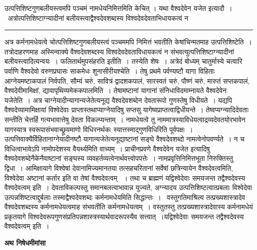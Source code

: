 \documentclass[11pt, openany]{book}
\begin{document}
{\bl उत्पत्तिशिष्टगुणबलीयस्त्वमपि पञ्चमं नामधेयनिमित्तमिति केचित् । यथा {\qtl वैश्वदेवेन यजेत}  इत्यादौ~।~अत्रोत्पत्तिशिष्टाग्न्यादीनां बलीयस्त्वाद्वैश्वदेवशब्दस्य विश्वदेवदेवताभिधायकत्वं न }\\
\hrule
\vspace{3mm}

 अत्र कर्मनामधेयत्वे चोत्पत्तिशिष्टगुणबलीयस्त्वं पञ्चममपि निमित्तं भवतीति  केषांचिन्मतमाह {\br उत्पत्तिशिष्टेति~।} तत्रोदाहरणमाह 
अस्मिन्वाक्ये वैश्वदेवशब्दस्य विश्वदेवदेवताविधायकत्वं न संभवत्युत्पत्तिशिष्टाग्न्यादीनां बलीयस्त्वादित्यन्वयः~। फलितार्थमुपसंहरति {\br इतीति~।} तस्येति शेषः~। {\br अत्रेदं बोध्यम्} चातुर्मास्ये चत्वारि पर्वाणि {\qt वैश्वदेवो वरुणप्रघासः  साकमेधः शुनासीरीयश्चेति~}। तेषु प्रथमे पर्वण्यष्टौ यागा विहिताः {\qt आग्नेयमष्टाकपालं निर्वपति, सौम्यं चरुं, सावित्रं द्वादशकपालं, सारस्वतं चरुं, पौष्णं चरुं, मारुतं सप्तकपालं, वैश्वदेवीमामिक्षां, द्यावापृथिव्यमेककपालमिति~}। तेषामष्टानां यागानां संनिधाविदमाम्नायते {\br वैश्वदेवेन यजेतेति~।} अत्र चाग्नेयादीन्यागान्यजेतेत्यनूद्य वैश्वदेवशब्देन देवतारूपो गुणस्तेषु विधीयते~। यद्यपि वैश्वदेव्यामामिक्षायां विश्वेदेवाः प्राप्तास्तथाप्याग्नेयादिषु सप्तसु
यागेष्वप्राप्तत्वाद्विधीयन्ते~। तेष्वप्यग्न्यादिदेवताः सन्तीति चेत्तर्हि गत्यभावात्तेषु देवता विकल्प्यन्ताम्~। नामधेयत्वे तु नाममात्रस्याविधेयत्वाद्रव्यदेवतयोरभावेन
यागस्यात्र  स्वरूपासंभवाच्छ्रूयमाणो विधिरनर्थकः स्यात्तस्माद्गुणविधिरिति पूर्वपक्षः~। उत्पत्तिवाक्यैर्विहितानाग्नेयादीनष्टौ यागान्यजेतेत्यनूद्याष्टानां सङ्घे वैश्वदेवशब्दो नामत्वेनोपवर्ण्यते~। न च विधित्वाभावेऽपि नामोपदेशस्य वैयर्थ्यमिति वाच्यम्~। {\qt प्राचीनप्रवणे वैश्वदेवेन यजेत} इत्यादिषु वैश्वदेवशब्देनैकेनैवाष्टानां सङ्घस्य व्यवहर्तव्यत्वेनार्थवत्त्वोपपत्तेः~। नामप्रवृत्तिनिमित्तभूता निरुक्तिस्तु द्विधा~। आमिक्षायागे विश्वेषां देवानामिज्यमानतया तत्सहचरितानां {\br सर्वेषां}
छत्रिन्यायेन  वैश्वदेवत्वमिति, विश्वेदेवा अष्टानां कर्तार इति वा तेषां वैश्वदेवत्वम् ~। तथा च  ब्राह्मणं {\qt यद्विश्वेदेवाः समयजन्त तद्वैश्वदेवस्य वैश्वदेवत्वम्}  इति~। देवताविकल्पस्तु समानबलत्वाभावान्न युज्यते, अग्न्यादय उत्पत्तिशिष्टत्वात्प्रबलाः विश्वेदेवा उत्पन्नशिष्टत्वाद्दुर्बलाः तस्माद्वैश्वदेवशब्दः कर्मनामधेयमिति सिद्धान्तः~।~ वस्तुगतिमाश्रित्य तत्प्रख्यशास्त्रादेव वैश्वदेवशब्दस्य कर्मनामधेयत्वमाह\textendash 
\newpage
\fancyhead[RE]{[ निषेधमीमांसा ]}
{\bl\noindent
संभवतीति कर्मनामधेयत्वम्~। वस्तुतस्तु तत्प्रख्यशास्त्रादेवास्य कर्मनामधेयं प्रकृतयागे विश्वदेवरूपगुणसंप्रतिपन्नशास्त्रस्यार्थवादरूपस्यैव सत्त्वात्~।{\qtl यद्विश्वेदेवाः समयजन्त तद्वैश्वदेवस्य वैश्वदेवत्वम्}  इति~।}
\begin{center}
 \textbf{अथ निषेधमीमांसा}   
\end{center}
 
\end{document}
